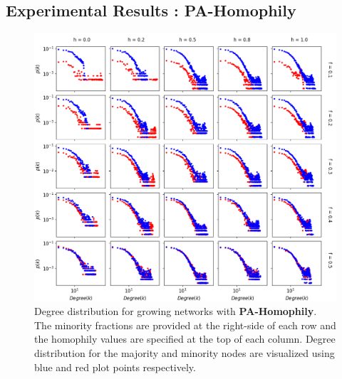 \subsection{Experimental Results : PA-Homophily}

\begin{figure}[h!]
	\centering
	\includegraphics[width=1.0\textwidth]{images/dd_growth_pa.png}
	\caption{Degree distribution for growing networks with \textbf{PA-Homophily}. The minority fractions are provided at the right-side of each row and the homophily values are specified at the top of each column. Degree distribution for the majority and minority nodes are visualized using blue and red plot points respectively.}
	\label{dd_growth_pa_fig}
\end{figure}

